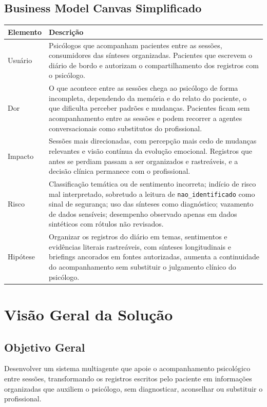 \documentclass[12pt,a4paper]{article}
\newcommand{\cab}[1]{\textbf{#1}}
\begin{document}
\subsection{Business Model Canvas Simplificado}
\begin{tabularx}{\textwidth}{|p{3.5cm}|Y|}
  \hline
  \cab{Elemento} & \cab{Descrição} \\ \hline
  Usuário   & Psicólogos que acompanham pacientes entre as sessões, consumidores das sínteses organizadas. Pacientes que escrevem o diário de bordo e autorizam o compartilhamento dos registros com o psicólogo. \\ \hline
  Dor       & O que acontece entre as sessões chega ao psicólogo de forma incompleta, dependendo da memória e do relato do paciente, o que dificulta perceber padrões e mudanças. Pacientes ficam sem acompanhamento entre as sessões e podem recorrer a agentes conversacionais como substitutos do profissional. \\ \hline
  Impacto   & Sessões mais direcionadas, com percepção mais cedo de mudanças relevantes e visão contínua da evolução emocional. Registros que antes se perdiam passam a ser organizados e rastreáveis, e a decisão clínica permanece com o profissional. \\ \hline
  Risco     & Classificação temática ou de sentimento incorreta; indício de risco mal interpretado, sobretudo a leitura de \texttt{nao\_identificado} como sinal de segurança; uso das sínteses como diagnóstico; vazamento de dados sensíveis; desempenho observado apenas em dados sintéticos com rótulos não revisados. \\ \hline
  Hipótese  & Organizar os registros do diário em temas, sentimentos e evidências literais rastreáveis, com sínteses longitudinais e briefings ancorados em fontes autorizadas, aumenta a continuidade do acompanhamento sem substituir o julgamento clínico do psicólogo. \\ \hline
\end{tabularx}

\section{Visão Geral da Solução}

\subsection{Objetivo Geral}
Desenvolver um sistema multiagente que apoie o acompanhamento psicológico entre sessões, transformando os registros escritos pelo paciente em informações organizadas que auxiliem o psicólogo, sem diagnosticar, aconselhar ou substituir o profissional.
\end{document}

